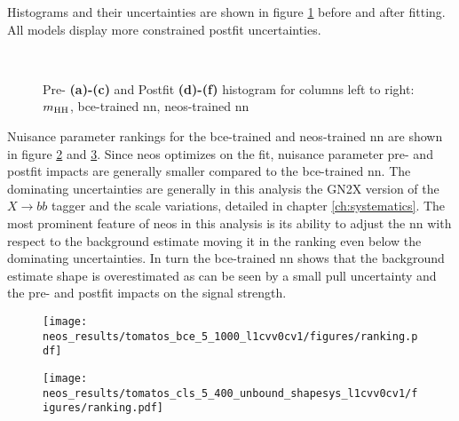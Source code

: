 Histograms and their uncertainties are shown in figure \ref{fig:neos_pre_post_fit} before and after fitting. All models display more constrained postfit uncertainties.
\begin{figure}
    \centering
     \\
    \caption[]{Pre- \textbf{(a)-(c)} and Postfit \textbf{(d)-(f)} histogram for columns left to right: $m_\text{HH}$, \ac{bce}-trained \ac{nn}, \ac{neos}-trained \ac{nn} }
    \label{fig:neos_pre_post_fit}
\end{figure}

Nuisance parameter rankings for the \ac{bce}-trained and neos-trained \ac{nn} are shown in figure \ref{fig:neos_valid_ranking_bce} and \ref{fig:neos_valid_ranking_cls}. Since \ac{neos} optimizes on the fit, nuisance parameter pre- and postfit impacts are generally smaller compared to the \ac{bce}-trained \ac{nn}. The dominating uncertainties are generally in this analysis the GN2X version of the $X\rightarrow bb$ tagger and the scale variations, detailed in chapter \ref{ch:systematics}. The most prominent feature of \ac{neos} in this analysis is its ability to adjust the \ac{nn} with respect to the background estimate moving it in the ranking even below the dominating uncertainties. In turn the \ac{bce}-trained \ac{nn} shows that the background estimate shape is overestimated as can be seen by a small pull uncertainty and the pre- and postfit impacts on the signal strength.

\begin{figure}
    \centering
    \texttt{[image: neos\_results/tomatos\_bce\_5\_1000\_l1cvv0cv1/figures/ranking.pdf]}
    \caption[]{}
    \label{fig:neos_valid_ranking_bce}
\end{figure}
\begin{figure}
    \centering
    \texttt{[image: neos\_results/tomatos\_cls\_5\_400\_unbound\_shapesys\_l1cvv0cv1/figures/ranking.pdf]}
    \caption[]{}
    \label{fig:neos_valid_ranking_cls}
\end{figure}

